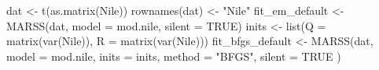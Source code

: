 \begin{Schunk}
\begin{Sinput}
 dat <- t(as.matrix(Nile))
 rownames(dat) <- "Nile"
 fit_em_default <- MARSS(dat, model = mod.nile, silent = TRUE)
 inits <- list(Q = matrix(var(Nile)), R = matrix(var(Nile)))
 fit_bfgs_default <- MARSS(dat,
   model = mod.nile, inits = inits,
   method = "BFGS", silent = TRUE
 )
\end{Sinput}
\end{Schunk}
